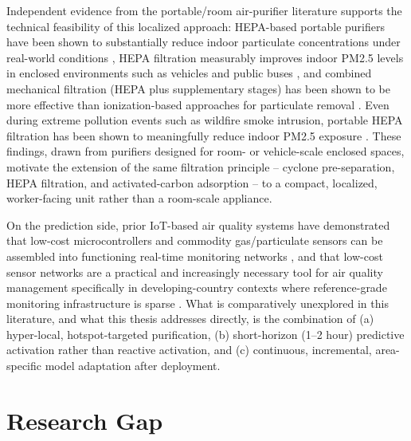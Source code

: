 Independent evidence from the portable/room air-purifier literature supports the technical feasibility of this localized approach: HEPA-based portable purifiers have been shown to substantially reduce indoor particulate concentrations under real-world conditions \citep{lu2023realworld,cox2018effectiveness}, HEPA filtration measurably improves indoor PM2.5 levels in enclosed environments such as vehicles and public buses \citep{lee2022effect,chen2022efficacy}, and combined mechanical filtration (HEPA plus supplementary stages) has been shown to be more effective than ionization-based approaches for particulate removal \citep{dubey2021assessing,szczotko2022review}. Even during extreme pollution events such as wildfire smoke intrusion, portable HEPA filtration has been shown to meaningfully reduce indoor PM2.5 exposure \citep{chen2025fine}. These findings, drawn from purifiers designed for room- or vehicle-scale enclosed spaces, motivate the extension of the same filtration principle -- cyclone pre-separation, HEPA filtration, and activated-carbon adsorption -- to a compact, localized, worker-facing unit rather than a room-scale appliance.

On the prediction side, prior IoT-based air quality systems have demonstrated that low-cost microcontrollers and commodity gas/particulate sensors can be assembled into functioning real-time monitoring networks \citep{alam2025iot,zhang2020realtime,kataria2022aiiot,mani2021aipowered}, and that low-cost sensor networks are a practical and increasingly necessary tool for air quality management specifically in developing-country contexts where reference-grade monitoring infrastructure is sparse \citep{shabbir2025paradigm}. What is comparatively unexplored in this literature, and what this thesis addresses directly, is the combination of (a) hyper-local, hotspot-targeted purification, (b) short-horizon (1--2 hour) predictive activation rather than reactive activation, and (c) continuous, incremental, area-specific model adaptation after deployment.

\section{Research Gap}
\label{sec:research-gap}


